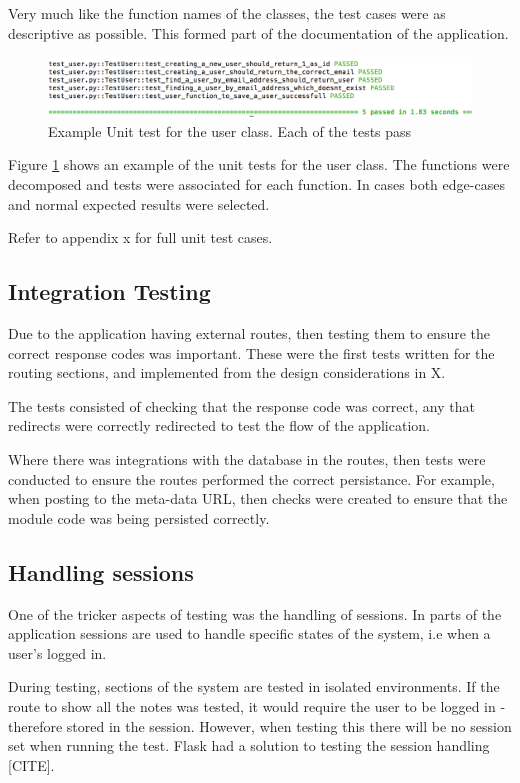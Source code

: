 Very much like the function names of the classes, the test cases were as descriptive as possible. This formed part of the documentation of the application.

\begin{figure}[h]
  \centering
  \includegraphics{images/unit_test_user}
  \caption{Example Unit test for the user class. Each of the tests pass}
  \label{fig:unit_user}
\end{figure}

Figure \ref{fig:unit_user} shows an example of the unit tests for the user class. The functions were decomposed and tests were associated for each function. In cases both edge-cases and normal expected results were selected.

Refer to appendix x for full unit test cases.

\subsection{Integration Testing}
Due to the application having external routes, then testing them to ensure the correct response codes was important. These were the first tests written for the routing sections, and implemented from the design considerations in X.

The tests consisted of checking that the response code was correct, any that redirects were correctly redirected to test the flow of the application.

Where there was integrations with the database in the routes, then tests were conducted to ensure the routes performed the correct persistance. For example, when posting to the meta-data URL, then checks were created to ensure that the module code was being persisted correctly.

\subsection{Handling sessions}
One of the tricker aspects of testing was the handling of sessions. In parts of the application sessions are used to handle specific states of the system, i.e when a user's logged in.

During testing, sections of the system are tested in isolated environments. If the route to show all the notes was tested, it would require the user to be logged in - therefore stored in the session. However, when testing this there will be no session set when running the test. Flask had a solution to testing the session handling [CITE].

